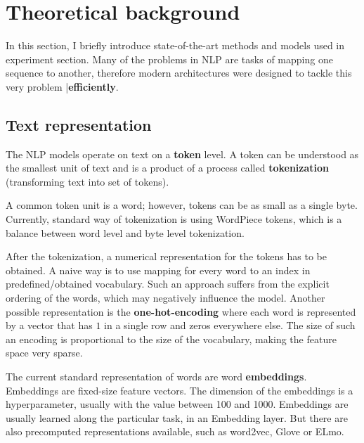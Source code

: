 \chapter{Theoretical background}
In this section, I briefly introduce state-of-the-art methods and models used in experiment section. Many of the problems in NLP are tasks of mapping one sequence to another, therefore modern architectures were designed to tackle this very problem |\textbf{efficiently}.





\section{Text representation}
The NLP models operate on text on a \textbf{token} level. A token can be understood as the smallest unit of text and is a product of a process called \textbf{tokenization} (transforming text into set of tokens).

A common token unit is a word; however, tokens can be as small as a single byte. Currently, standard way of tokenization is using WordPiece tokens, which is a balance between word level and byte level tokenization.

After the tokenization, a numerical representation for the tokens has to be obtained. A naive way is to use mapping for every word to an index in predefined/obtained vocabulary. Such an approach suffers from the explicit ordering of the words, which may negatively influence the model. Another possible representation is the \textbf{one-hot-encoding} where each word is represented by a vector that has $1$ in a single row and zeros everywhere else. The size of such an encoding is proportional to the size of the vocabulary, making the feature space very sparse. 

The current standard representation of words are word \textbf{embeddings}. Embeddings are fixed-size feature vectors. The dimension of the embeddings is a hyperparameter, usually with the value between 100 and 1000. Embeddings are usually learned along the particular task, in an Embedding layer. But there are also precomputed representations available, such as word2vec, Glove or ELmo.
\newpage





